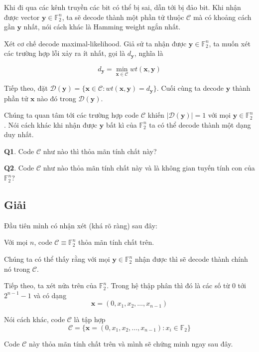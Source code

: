 Khi đi qua các kênh truyền các bit có thể bị sai, dẫn tới bị đảo bit. Khi nhận được vector $\bm{y} \in \mathbb{F}_2^n$, ta sẽ decode thành một phần tử thuộc $\mathcal{C}$ mà có khoảng cách gần $\bm{y}$ nhất, nói cách khác là Hamming weight ngắn nhất.

Xét cơ chế decode maximal-likelihood. Giả sử ta nhận được $\bm{y} \in \mathbb{F}_2^n$, ta muốn xét các trường hợp lỗi xảy ra ít nhất, gọi là $d_{\bm{y}}$, nghĩa là

\begin{equation*}
    d_{\bm{y}} = \min_{\bm{x} \in \mathcal{C}} wt(\bm{x}, \bm{y})
\end{equation*}

Tiếp theo, đặt $\mathcal{D} (\bm{y}) = \{ \bm{x} \in \mathcal{C} : wt(\bm{x}, \bm{y}) = d_{\bm{y}} \}$. Cuối cùng ta decode $\bm{y}$ thành phần tử $\bm{x}$ nào đó trong $\mathcal{D}(\bm{y})$.

Chúng ta quan tâm tới các trường hợp code $\mathcal{C}$ khiến $\lvert \mathcal{D}(\bm{y}) \rvert = 1$ với mọi $\bm{y} \in \mathbb{F}_2^n$. Nói cách khác khi nhận được $\bm{y}$ bất kì của $\mathbb{F}_2^n$ ta có thể decode thành một dạng duy nhất.

\textbf{Q1}. Code $\mathcal{C}$ như nào thì thỏa mãn tính chất này?

\textbf{Q2}. Code $\mathcal{C}$ như nào thỏa mãn tính chất này và là không gian tuyến tính con của $\mathbb{F}_2^n$?

\subsection*{Giải}

Đầu tiên mình có nhận xét (khá rõ ràng) sau đây:

\begin{remark}
    Với mọi $n$, code $\mathcal{C} \equiv \mathbb{F}_2^n$ thỏa mãn tính chất trên.
\end{remark}

Chúng ta có thể thấy rằng với mọi $\bm{y} \in \mathbb{F}_2^n$ nhận được thì sẽ decode thành chính nó trong $\mathcal{C}$.

Tiếp theo, ta xét nửa trên của $\mathbb{F}_2^n$. Trong hệ thập phân thì đó là các số từ $0$ tới $2^{n-1} - 1$ và có dạng \[ \bm{x} = (0, x_1, x_2, \ldots, x_{n-1}) \]

Nói cách khác, code $\mathcal{C}$ là tập hợp \[ \mathcal{C} = \{ \bm{x} = (0, x_1, x_2, \ldots, x_{n-1}): x_i \in \mathbb{F}_2 \} \]

Code $\mathcal{C}$ này thỏa mãn tính chất trên và mình sẽ chứng minh ngay sau đây.

